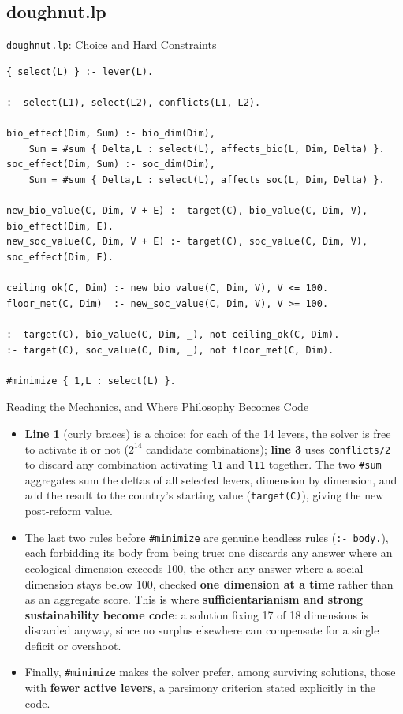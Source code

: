 \documentclass[11pt,aspectratio=169]{beamer}
\begin{document}
\subsection{doughnut.lp}
\begin{frame}[fragile]{\texttt{doughnut.lp}: Choice and Hard Constraints}
\begin{lstlisting}
{ select(L) } :- lever(L).

:- select(L1), select(L2), conflicts(L1, L2).

bio_effect(Dim, Sum) :- bio_dim(Dim),
    Sum = #sum { Delta,L : select(L), affects_bio(L, Dim, Delta) }.
soc_effect(Dim, Sum) :- soc_dim(Dim),
    Sum = #sum { Delta,L : select(L), affects_soc(L, Dim, Delta) }.

new_bio_value(C, Dim, V + E) :- target(C), bio_value(C, Dim, V), bio_effect(Dim, E).
new_soc_value(C, Dim, V + E) :- target(C), soc_value(C, Dim, V), soc_effect(Dim, E).

ceiling_ok(C, Dim) :- new_bio_value(C, Dim, V), V <= 100.
floor_met(C, Dim)  :- new_soc_value(C, Dim, V), V >= 100.

:- target(C), bio_value(C, Dim, _), not ceiling_ok(C, Dim).
:- target(C), soc_value(C, Dim, _), not floor_met(C, Dim).

#minimize { 1,L : select(L) }.
\end{lstlisting}
\end{frame}

\begin{frame}{Reading the Mechanics, and Where Philosophy Becomes Code}
  \footnotesize
  \begin{itemize}
    \item \textbf{Line 1} (curly braces) is a \alert{choice}: for each of the 14 levers, the solver is free to activate it or not ($2^{14}$ candidate combinations); \textbf{line 3} uses \texttt{conflicts/2} to discard any combination activating \texttt{l1} and \texttt{l11} together. The two \texttt{\#sum} aggregates sum the deltas of all selected levers, dimension by dimension, and add the result to the country's starting value (\texttt{target(C)}), giving the new post-reform value.
    \item The last two rules before \texttt{\#minimize} are genuine \alert{headless rules} (\texttt{:- body.}), each forbidding its body from being true: one discards any answer where an ecological dimension exceeds 100, the other any answer where a social dimension stays below 100, checked \textbf{one dimension at a time} rather than as an aggregate score. This is where \textbf{sufficientarianism and strong sustainability become code}: a solution fixing 17 of 18 dimensions is discarded anyway, since no surplus elsewhere can compensate for a single deficit or overshoot.
    \item Finally, \texttt{\#minimize} makes the solver prefer, among surviving solutions, those with \textbf{fewer active levers}, a parsimony criterion stated explicitly in the code.
  \end{itemize}
\end{frame}
\end{document}
